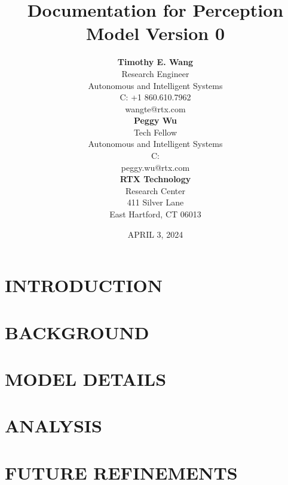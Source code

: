 \documentclass{article}
\title{Documentation for Perception Model Version 0}
\author{%
	\textbf{Timothy E. Wang} \\
    Research Engineer \\
	Autonomous and Intelligent Systems \\
	C: +1 860.610.7962 \\
	wangte@rtx.com  \\
    \vspace{12pt} 
    \textbf{Peggy Wu} \\
    Tech Fellow \\
	Autonomous and Intelligent Systems \\
	C: \\
	peggy.wu@rtx.com  \\
	\vspace{12pt} 
	\textbf{RTX Technology} \\
	Research Center \\
	411 Silver Lane \\
	East Hartford, CT 06013}
\date{APRIL 3, 2024}
\begin{document}
\maketitle

\pagestyle{simplefooter}
\tableofcontents
\newpage

\pagestyle{simplefooter} 
\section{INTRODUCTION} 
\label{sec:intro}


\section{BACKGROUND} 
\label{sec:background}


\section{MODEL DETAILS} 
\label{sec:model}


\section{ANALYSIS} 
\label{sec:analysis}


\section{FUTURE REFINEMENTS} 
\label{sec:refine}



\newpage


\end{document}
